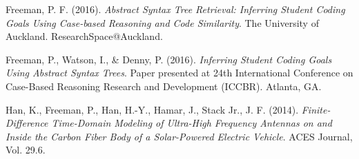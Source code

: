 \documentclass[a4paper]{twentysecondcv}
\begin{document}
Freeman, P. F. (2016). \emph{Abstract Syntax Tree Retrieval: Inferring Student
Coding Goals Using Case-based Reasoning and Code Similarity}. The University of
Auckland. ResearchSpace@Auckland.

Freeman, P., Watson, I., \& Denny, P. (2016). \emph{Inferring Student Coding
Goals Using Abstract Syntax Trees}. Paper presented at 24th International
Conference on Case-Based Reasoning Research and Development (ICCBR). Atlanta, GA.\@

Han, K., Freeman, P., Han, H.-Y., Hamar, J., Stack Jr., J. F. (2014).
\emph{Finite-Difference Time-Domain Modeling of Ultra-High Frequency Antennas
on and Inside the Carbon Fiber Body of a Solar-Powered Electric Vehicle}. ACES
Journal, Vol. 29.6.
\end{document}

